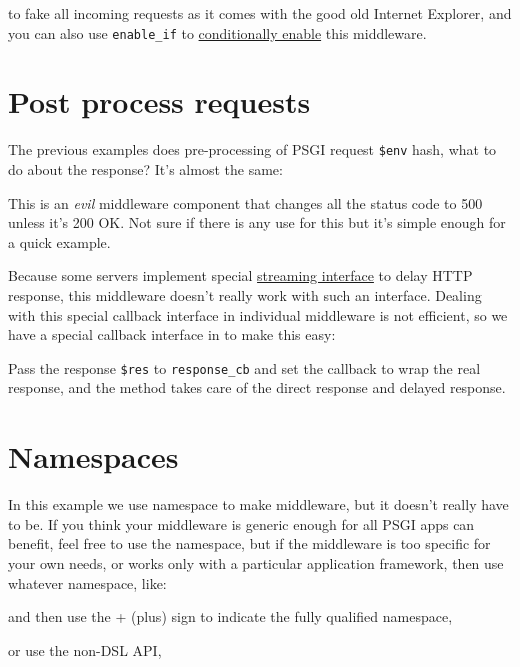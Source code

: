 %
to fake all incoming requests as it comes with the good old Internet
Explorer, and you can also use \lstinline!enable_if! to
\href{http://advent.plackperl.org/2009/12/day-18-load-middleware-conditionally.html}{conditionally
enable} this middleware.

\section{Post process requests}\label{post-process-requests}

The previous examples does pre-processing of PSGI request
\lstinline!$env! hash, what to do about the response? It's almost the
same:


This is an \emph{evil} middleware component that changes all the status
code to 500 unless it's 200 OK. Not sure if there is any use for this
but it's simple enough for a quick example.

Because some servers implement special
\href{http://bulknews.typepad.com/blog/2009/10/psgiplack-streaming-is-now-complete.html}{streaming
interface} to delay HTTP response, this middleware doesn't really work
with such an interface. Dealing with this special callback interface in
individual middleware is not efficient, so we have a special callback
interface in  to make this easy:


Pass the response \lstinline!$res! to \lstinline!response_cb! and set
the callback to wrap the real response, and the method takes care of the
direct response and delayed response.

\section{Namespaces}\label{namespaces}

In this example we use  namespace to make middleware,
but it doesn't really have to be. If you think your middleware is
generic enough for all PSGI apps can benefit, feel free to use the
namespace, but if the middleware is too specific for your own needs, or
works only with a particular application framework, then use whatever
namespace, like:

%
and then use the + (plus) sign to indicate the fully qualified
namespace,

%
or use the non-DSL API,

